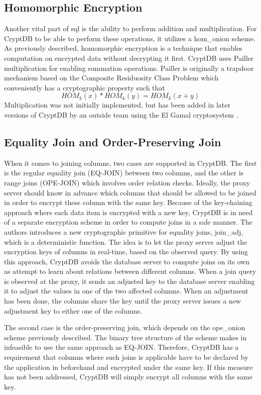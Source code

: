 \subsection{Homomorphic Encryption}
Another vital part of \Gls{sql} is the ability to perform addition and multiplication. For CryptDB to be able to perform these operations, it utilizes a \Gls{hom_onion} scheme. As previously described, homomorphic encryption is a technique that enables computation on encrypted data without decrypting it first. CryptDB uses Pailler multiplication \cite{Paillier} for enabling summation operations. Pailler is originally a trapdoor mechanism based on the Composite Residuosity Class Problem which conveniently has a cryptographic property such that \[HOM_k(x) * HOM_k(y) = HOM_k(x + y)\] Multiplication was not initially implemented, but has been added in later versions of CryptDB by an outside team using the El Gamal cryptosystem \cite{cryptdb_guidelines}.


\subsection{Equality Join and Order-Preserving Join}
When it comes to joining columns, two cases are supported in CryptDB. The first is the regular equality join (EQ-JOIN) between two columns, and the other is range joins (OPE-JOIN) which involves order relation checks. Ideally, the proxy server should know in advance which columns that should be allowed to be joined in order to encrypt these column with the same key. Because of the key-chaining approach where each data item is encrypted with a new key, CryptDB is in need of a separate encryption scheme in order to compute joins in a safe manner. The authors \citep{CryptDB_Main_Paper} introduces a new cryptographic primitive for equality joins, \gls{join_adj}, which is a deterministic function. The idea is to let the proxy server adjust the encryption keys of columns in real-time, based on the observed query. By using this approach, CryptDB avoids the database server to compute joins on its own as attempt to learn about relations between different columns. When a join query is observed at the proxy, it sends an adjusted key to the database server enabling it to adjust the values in one of the two affected columns. When an adjustment has been done, the columns share the key until the proxy server issues a new adjustment key to either one of the columns.

The second case is the order-preserving join, which depends on the \gls{ope_onion} scheme previously described. The binary tree structure of the scheme makes in infeasible to use the same approach as EQ-JOIN. Therefore, CryptDB has a requirement that columns where such joins is applicable have to be declared by the application in beforehand and encrypted under the same key. If this measure has not been addressed, CryptDB will simply encrypt all columns with the same key.


